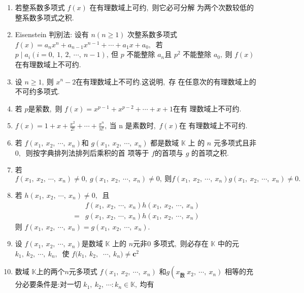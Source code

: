 \begin{enumerate}
		\item 若整系数多项式  $f(x)$  在有理数域上可约,\  则它必可分解 为两个次数较低的整系数多项式之积.
		\item Eisenstein 判别法: 设有 $ n(n \geqslant 1) $ 次整系数多项式  $f(x)=a_{n} x^{n}+a_{n-1} x^{n-1}+\cdots+a_{1} x+a_{0} ,\ $ 若$  p \mid a_{i}(i=   0,\ 1,\ 2,\  \cdots,\  n-1) ,\  $但  $p $ 不能整除  $a_{n}  $且  $p^{2} $ 不能整除  $a_{0} ,\  $则  $f(x)  $在有理数域上不可约.
		\item 设 $ n \geqslant 1 ,\  $则  $x^{n}-2  $在有理数域上不可约.这说明,\  存 在任意次的有理数域上的不可约多项式.
		\item 若  $p  $是萦数,\  则 $ f(x)=x^{p-1}+x^{p-2}+\cdots+x+1  $在有 理数域上不可约.
		\item  $f(x)=1+x+\frac{x^{2}}{2 !}+\cdots+\frac{x^{n}}{n !} ,\  $当  n  是素数时,\ $  f(x)  $在 有理数域上不可约.
		\item 若  $f\left(x_{1},\  x_{2},\  \cdots,\  x_{n}\right)  $和  $g\left(x_{1},\  x_{2},\  \cdots,\  x_{n}\right)$  都是数域 $ \mathbb{K} $ 上 的  $n$  元多项式且非$ 0 ,\ $ 则按字典排列法排列后乘积的首 项等于 $ f  $的首项与  $g $ 的首项之积.
		\item 若 $ f\left(x_{1},\  x_{2},\  \cdots,\  x_{n}\right) \neq 0,\  g\left(x_{1},\  x_{2},\  \cdots,\  x_{n}\right) \neq 0 ,\  则  f\left(x_{1},\  x_{2},\  \cdots,\  x_{n}\right) g\left(x_{1},\  x_{2},\  \cdots,\  x_{n}\right) \neq 0 .$
		\item 若  $h\left(x_{1},\  x_{2},\  \cdots,\  x_{n}\right) \neq 0 ,\ $ 且
		$$\begin{aligned}
			& f\left(x_{1},\  x_{2},\  \cdots,\  x_{n}\right) h\left(x_{1},\  x_{2},\  \cdots,\  x_{n}\right) \\
			=& g\left(x_{1},\  x_{2},\  \cdots,\  x_{n}\right) h\left(x_{1},\  x_{2},\  \cdots,\  x_{n}\right)
		\end{aligned}$$
		则  $f\left(x_{1},\  x_{2},\  \cdots,\  x_{n}\right)=g\left(x_{1},\  x_{2},\  \cdots,\  x_{n}\right) .$
		\item 设  $f\left(x_{1},\  x_{2},\  \cdots,\  x_{n}\right)  $是数域  $\mathbb{K}$  上的 $ n  $元非$ 0$ 多项式,\  则必存在 $ \mathbb{K}$  中的元  $k_{1},\  k_{2},\  \cdots,\  k_{n} ,\ $ 使 $ f(k_{1},\  k_{2},\ $ $\cdots,\  k_{n}) \neq \boldsymbol{c}^{2} $
		\item 数域  $\mathbb{K}  $上的两个$  n  $元多项式 $ f\left(x_{1},\  x_{2},\  \cdots,\  x_{n}\right) $ 和$  g\left(x_{\text {数 }}\right.   \left.x_{2},\  \cdots,\  x_{n}\right) $ 相等的充分必要条件是:对一切 $ k_{1},\  k_{2},\  \cdots  :  k_{n} \in \mathbb{K} ,\  $均有

\end{enumerate}

